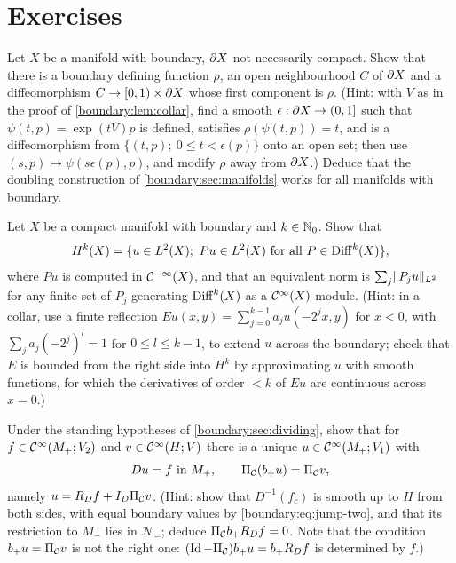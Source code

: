 \section{Exercises}\label{boundary:sec:exercises}

\begin{exercise}\label{boundary:ex:collar-noncompact}
Let $X$ be a manifold with boundary, $\partial X$ not necessarily compact. Show that there is a
boundary defining function $\rho$, an open neighbourhood $C$ of $\partial X$ and a
diffeomorphism $C\to[0,1)\times\partial X$ whose first component is $\rho$. (Hint: with $V$ as
in the proof of \cref{boundary:lem:collar}, find a smooth $\epsilon:\partial X\to(0,1]$ such
that $\psi(t,p)=\exp(tV)p$ is defined, satisfies $\rho(\psi(t,p))=t$, and is a
diffeomorphism from $\{(t,p);\ 0\le t<\epsilon(p)\}$ onto an open set; then use
$(s,p)\mapsto\psi(s\epsilon(p),p)$, and modify $\rho$ away from $\partial X$.) Deduce that the
doubling construction of \cref{boundary:sec:manifolds} works for all manifolds with
boundary.
\end{exercise}

\begin{exercise}\label{boundary:ex:sobolev-intrinsic}
Let $X$ be a compact manifold with boundary and $k\in\mathbb{N}_0$. Show that
\begin{equation*}
H^k(X)=\{u\in L^2(X);\ Pu\in L^2(X)\ \text{for all}\ P\in\operatorname{Diff}^{k}(X)\},
\end{equation*}
where $Pu$ is computed in $\mathcal{C}^{-\infty}(X)$, and that an equivalent norm is
$\sum_j\lVert P_ju\rVert_{L^2}$ for any finite set of $P_j$ generating $\operatorname{Diff}^{k}(X)$ as a
$\mathcal{C}^\infty(X)$-module. (Hint: in a collar,
use a finite reflection $Eu(x,y)=\sum_{j=0}^{k-1}a_ju(-2^jx,y)$ for $x<0$, with
$\sum_ja_j(-2^j)^l=1$ for $0\le l\le k-1$, to extend $u$ across the boundary; check that
$E$ is bounded from the right side into $H^k$ by approximating $u$ with smooth functions,
for which the derivatives of order $<k$ of $Eu$ are continuous across $x=0$.)
\end{exercise}

\begin{exercise}\label{boundary:ex:calderon-bvp}
Under the standing hypotheses of \cref{boundary:sec:dividing}, show that for $f\in
\mathcal{C}^\infty(M_+;V_2)$ and $v\in\mathcal{C}^\infty(H;V)$ there is a unique $u\in\mathcal{C}^\infty(M_+;V_1)$ with
\begin{equation*}
Du=f\ \text{in}\ M_+,\qquad \Pi_{\mathcal{C}}(b_+u)=\Pi_{\mathcal{C}} v,
\end{equation*}
namely $u=R_Df+I_D\Pi_{\mathcal{C}} v$. (Hint: show that $D^{-1}(f_c)$ is smooth up to $H$ from both
sides, with equal boundary values by \eqref{boundary:eq:jump-two}, and that its restriction
to $M_-$ lies in $\mathcal{N}_-$; deduce $\Pi_{\mathcal{C}} b_+R_Df=0$. Note that the condition
$b_+u=\Pi_{\mathcal{C}} v$ is not the right one: $(\operatorname{Id}-\Pi_{\mathcal{C}})b_+u=b_+R_Df$ is determined by $f$.)
\end{exercise}

